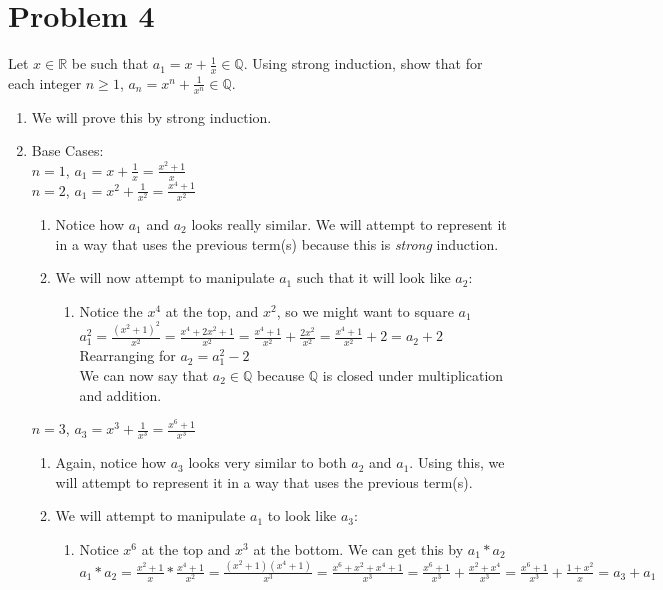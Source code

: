 \documentclass[11pt,letterpaper]{article}
\begin{document}
\section*{Problem 4}
Let $x \in \mathbb{R}$ be such that $a_1 = x + \frac{1}{x} \in \mathbb{Q}.$ Using strong induction, show that for each integer $n \geq 1$, $a_n = x^n + \frac{1}{x^n} \in \mathbb{Q}.$
\begin{enumerate}
	\item[] We will prove this by strong induction.
	\item[] Base Cases: 
	\\$n = 1$, $a_1 = x + \frac{1}{x} = \frac{x^2 + 1}{x}$
	\\ $n = 2$, $a_1 = x^2 + \frac{1}{x^2} = \frac{x^4 + 1}{x^2}$
	\begin{enumerate}
		\item Notice how $a_1$ and $a_2$ looks really similar. We will attempt to represent it in a way that uses the previous term(s) because this is \textit{strong} induction.
		\item We will now attempt to manipulate $a_1$ such that it will look like $a_2$:
		\begin{enumerate}
			\item[] Notice the $x^4$ at the top, and $x^2$, so we might want to square $a_1$
			\\$a_1^2 = \frac{(x^2 + 1)^2}{x^2} = \frac{x^4 + 2x^2 + 1}{x^2} = \frac{x^4 +1}{x^2} + \frac{2x^2}{x^2} = \frac{x^4 +1}{x^2} + 2 = a_2 + 2$
			\\ Rearranging for $a_2 = a_1^2 - 2$
			\\ We can now say that $a_2 \in \mathbb{Q}$ because $\mathbb{Q}$ is closed under multiplication and addition.
		\end{enumerate}
	\end{enumerate}
	$n = 3$, $a_3 = x^3 + \frac{1}{x^3} = \frac{x^6 + 1}{x^3}$
	\begin{enumerate}
		\item Again, notice how $a_3$ looks very similar to both $a_2$ and $a_1$. Using this, we will attempt to represent it in a way that uses the previous term(s).
		\item We will attempt to manipulate $a_1$ to look like $a_3$:
		\begin{enumerate}
			\item[] Notice $x^6$ at the top and $x^3$ at the bottom. We can get this by $a_1 * a_2$
			\\ $a_1 * a_2 = \frac{x^2 + 1}{x} * \frac{x^4 + 1}{x^2} = \frac{(x^2 + 1)(x^4 + 1)}{x^3} = \frac{x^6 + x^2+ x^4 + 1}{x^3} = \frac{x^6 + 1}{x^3} + \frac{x^2 + x^4}{x^3} = \frac{x^6 + 1}{x^3} + \frac{1+ x^2}{x} = a_3 + a_1 $

\end{enumerate}
\end{enumerate}
\end{enumerate}
\end{document}
